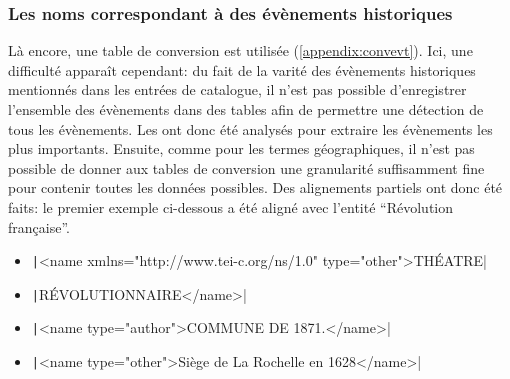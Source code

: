\subsubsection{Les noms correspondant à des évènements historiques}
Là encore, une table de conversion est utilisée (\ref{appendix:convevt}). Ici, une difficulté apparaît cependant: du fait de la varité des évènements historiques mentionnés dans les entrées de catalogue, il n'est pas possible d'enregistrer l'ensemble des évènements dans des tables afin de permettre une détection de tous les évènements. Les \tname{} ont donc été analysés pour extraire les évènements les plus importants. Ensuite, comme pour les termes géographiques, il n'est pas possible de donner aux tables de conversion une granularité suffisamment fine pour contenir toutes les données possibles. Des alignements partiels ont donc été faits: le premier exemple ci-dessous a été aligné avec l'entité \wkd{} \enquote{Révolution française}.
\begin{itemize}
	\item \texttt|<name xmlns="http://www.tei-c.org/ns/1.0" type="other">THÉATRE|
\end{itemize}
\begin{itemize}[label={}]
	\item \texttt|RÉVOLUTIONNAIRE</name>|
\end{itemize}
\begin{itemize}
	\item \texttt|<name type="author">COMMUNE DE 1871.</name>|
	\item \texttt|<name type="other">Siège de La Rochelle en 1628</name>|
\end{itemize}

